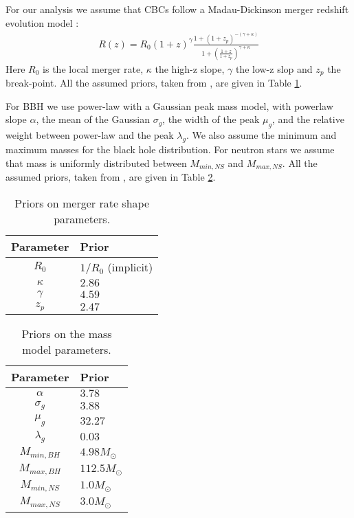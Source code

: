 For our analysis we assume that \acp{CBC} follow a Madau-Dickinson merger redshift evolution model \citep{madau2014cosmic}:
\begin{align}
    R(z) = R_0(1+z)^{\gamma}\frac{1+(1+z_p)^{-(\gamma+\kappa)}}{1+\left( \frac{1+z}{1+z_p}\right)^{\gamma + \kappa}}
\end{align}
Here $R_0$ is the local merger rate, $\kappa$ the high-z slope, $\gamma$ the low-z slop and $z_p$ the break-point. All the assumed priors, taken from \citet{abbott2023gwtc}, are given in Table \ref{tab:Madau}.

For \ac{BBH} we use power-law with a Gaussian peak mass model, with powerlaw slope $\alpha$, the mean of the Gaussian $\sigma_g$, the width 
of the peak $\mu_g$, and the relative weight between power-law and
the peak $\lambda_g$. We also assume the minimum and maximum masses for the black hole distribution. For neutron stars we assume that
mass is uniformly distributed between $M_{min,NS}$ and
$M_{max,NS}$. All the assumed priors, taken from \citet{abbott2023gwtc}, are given in Table \ref{tab:mass_dist}.

\begin{table}[h!]
    \small
    \centering
    \caption{Priors on merger rate shape parameters.}
    \label{tab:Madau}
    \begin{tabular}{c l}
        \hline
        \textbf{Parameter} & \textbf{Prior} \\
        \hline
         $R_0$ & $1/R_0$ (implicit) \\
         $\kappa$ & $2.86$ \\
         $\gamma$ & $4.59$ \\
         $z_p$ & $2.47$ \\
         \hline
    \end{tabular}
\end{table}

\begin{table}[h!]
    \small
    \centering
    \caption{Priors on the mass model parameters.}
    \label{tab:mass_dist}
    \begin{tabular}{c l}
        \hline
        \textbf{Parameter} & \textbf{Prior} \\
        \hline
         $\alpha$ & $3.78$ \\
         $\sigma_g$ & $3.88$ \\
         $\mu_g$ & $32.27$ \\
         $\lambda_g$ & $0.03$ \\
         $M_{min,BH}$ & $4.98M_{\odot}$ \\
         $M_{max,BH}$ & $112.5M_{\odot}$ \\
         $M_{min, NS}$ & $1.0M_{\odot}$ \\
         $M_{max, NS}$ & $3.0M_{\odot}$ \\
         \hline
    \end{tabular}
\end{table}

